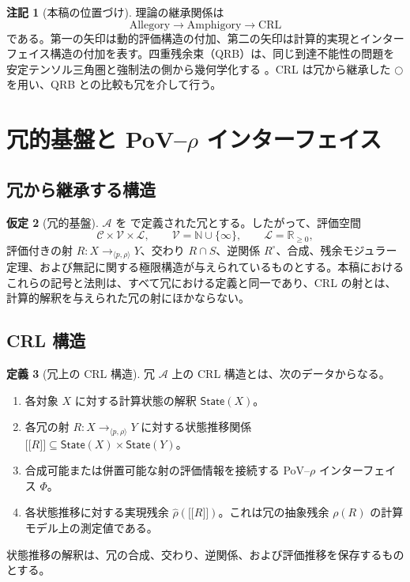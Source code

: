 \documentclass[a4paper,11pt]{ltjsarticle}
\theoremstyle{definition}
\newtheorem{definition}{定義}[section]
\newtheorem{assumption}[definition]{仮定}
\newtheorem{remark}[definition]{注記}
\theoremstyle{plain}
\newcommand{\dfix}{\bigcirc}
\newcommand{\sem}[1]{\mathopen{[\![}#1\mathclose{]\!]}}
\begin{document}
\begin{remark}[本稿の位置づけ]
理論の継承関係は
\[
 \text{Allegory}\longrightarrow\text{Amphigory}
 \longrightarrow\text{CRL}
\]
である。第一の矢印は動的評価構造の付加、第二の矢印は計算的実現とインターフェイス構造の付加を表す。四重残余束（QRB）は、同じ到達不能性の問題を安定テンソル三角圏と強制法の側から幾何学化する \cite{ChibaQRB2026}。CRL は冗から継承した $\dfix$ を用い、QRB との比較も冗を介して行う。
\end{remark}

\section{冗的基盤と PoV--\texorpdfstring{$\rho$}{rho} インターフェイス}

\subsection{冗から継承する構造}

\begin{assumption}[冗的基盤]
$\mathcal{A}$ を \cite{ChibaAmphigory2026} で定義された冗とする。したがって、評価空間
\[
 \mathcal{C}\times\mathcal{V}\times\mathcal{L},
 \qquad
 \mathcal{V}=\mathbb{N}\cup\{\infty\},
 \qquad
 \mathcal{L}=\mathbb{R}_{\geq0},
\]
評価付きの射 $R:X\to_{\langle p,\rho\rangle}Y$、交わり $R\cap S$、逆関係 $R^\circ$、合成、残余モジュラー定理、および無記に関する極限構造が与えられているものとする。本稿におけるこれらの記号と法則は、すべて冗における定義と同一であり、CRL の射とは、計算的解釈を与えられた冗の射にほかならない。
\end{assumption}

\subsection{CRL 構造}

\begin{definition}[冗上の CRL 構造]
冗 $\mathcal{A}$ 上の CRL 構造とは、次のデータからなる。
\begin{enumerate}
 \item 各対象 $X$ に対する計算状態の解釈 $\mathsf{State}(X)$。
 \item 各冗の射 $R:X\to_{\langle p,\rho\rangle}Y$ に対する状態推移関係 $\sem{R}\subseteq\mathsf{State}(X)\times\mathsf{State}(Y)$。
 \item 合成可能または併置可能な射の評価情報を接続する PoV--$\rho$ インターフェイス $\Phi$。
 \item 各状態推移に対する実現残余 $\widehat{\rho}(\sem{R})$。これは冗の抽象残余 $\rho(R)$ の計算モデル上の測定値である。
\end{enumerate}
状態推移の解釈は、冗の合成、交わり、逆関係、および評価推移を保存するものとする。
\end{definition}
\end{document}
